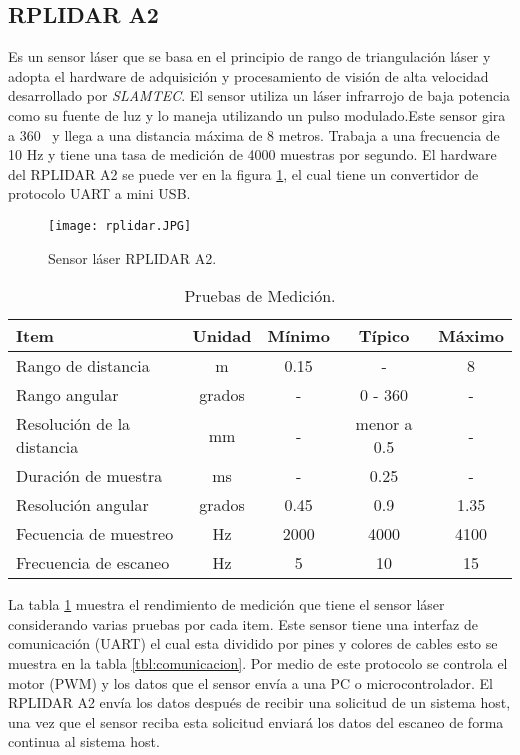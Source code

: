 \subsection{RPLIDAR A2}
Es un sensor láser que se basa en el  principio de rango de triangulación láser \cite{amann2001laser} y adopta el hardware de adquisición y procesamiento de visión de alta velocidad desarrollado por \textit{SLAMTEC}. El sensor utiliza un láser infrarrojo de baja potencia como su fuente de luz y lo maneja utilizando un pulso modulado.Este sensor gira a 360 \grad ~y llega a una distancia máxima de 8 metros. Trabaja a una frecuencia de 10 Hz y tiene una tasa de medición de 4000 muestras por segundo. El hardware del RPLIDAR A2 se puede ver en la figura \ref{f:lidar}, el cual tiene un convertidor de protocolo UART a mini USB.
\begin{figure}
\centering
\texttt{[image: rplidar.JPG]}
\caption{Sensor láser RPLIDAR A2.}
\label{f:lidar}
\end{figure}


\begin{table}[htbp]
\begin{center}
\begin{tabular}{|l|c|c|c|c|}
\hline
Item & Unidad & Mínimo & Típico & Máximo\\
\hline \hline
Rango de distancia & m & 0.15 & - & 8 \\ \hline
Rango angular & grados & - & 0 - 360 & - \\ \hline
Resolución de la distancia & mm & - & menor a 0.5 & - \\ \hline
Duración de muestra & ms & - & 0.25 & - \\ \hline
Resolución angular & grados & 0.45 & 0.9 & 1.35 \\ \hline
Fecuencia de muestreo & Hz & 2000 & 4000 & 4100 \\ \hline
Frecuencia de escaneo & Hz & 5 & 10 & 15 \\ \hline
\end{tabular}
\caption{Pruebas de Medición.}
\label{tbl:medicion}
\end{center}
\end{table}

La tabla \ref{tbl:medicion} muestra el rendimiento de medición \cite{Slamtec} que tiene el sensor láser considerando varias pruebas por cada item. Este sensor tiene una interfaz de comunicación (UART) el cual esta dividido por pines y colores de cables esto se muestra en la tabla \ref{tbl:comunicacion}. Por medio de este protocolo se controla el motor (PWM) y los datos que el sensor envía a una PC o microcontrolador. El RPLIDAR A2 envía los datos después de recibir una solicitud de un sistema host, una vez que el sensor reciba esta solicitud enviará los datos del escaneo de forma continua al sistema host.

